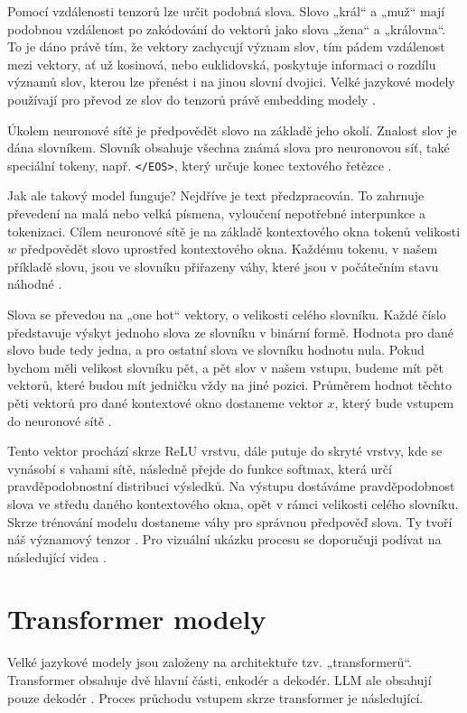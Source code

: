\documentclass[FM,DP]{tulthesis}
\begin{document}
		Pomocí vzdálenosti tenzorů lze určit podobná slova. Slovo „král“ a „muž“ mají podobnou vzdálenost po zakódování do vektorů jako slova „žena“ a „královna“. To je dáno právě tím, že vektory zachycují význam slov, tím pádem vzdálenost mezi vektory, ať už kosinová, nebo euklidovská, poskytuje informaci o rozdílu významů slov, kterou lze přenést i na jinou slovní dvojici. Velké jazykové modely používají pro převod ze slov do tenzorů právě embedding modely \cite{embeddings} \cite{embeddings2}.
		
		Úkolem neuronové sítě je předpovědět slovo na základě jeho okolí. Znalost slov je dána slovníkem. Slovník obsahuje všechna známá slova pro neuronovou síť, také speciální tokeny, např. \verb|</EOS>|, který určuje konec textového řetězce \cite{embeddings2}. 
		
		Jak ale takový model funguje? Nejdříve je text předzpracován. To zahrnuje převedení na malá nebo velká písmena, vyloučení nepotřebné interpunkce a tokenizaci. Cílem neuronové sítě je na základě kontextového okna tokenů velikosti $w$ předpovědět slovo uprostřed kontextového okna. Každému tokenu, v našem příkladě slovu, jsou ve slovníku přiřazeny váhy, které jsou v počátečním stavu náhodné \cite{ytb:word2vec}. 
		
		Slova se převedou na „one hot“ vektory, o velikosti celého slovníku. Každé číslo představuje výskyt jednoho slova ze slovníku v binární formě. Hodnota pro dané slovo bude tedy jedna, a pro ostatní slova ve slovníku hodnotu nula. Pokud bychom měli velikost slovníku pět, a pět slov v našem vstupu, budeme mít pět vektorů, které budou mít jedničku vždy na jiné pozici. Průměrem hodnot těchto pěti vektorů pro dané kontextové okno dostaneme vektor $x$, který bude vstupem do neuronové sítě \cite{ytb:word2vec}.
		
		Tento vektor prochází skrze ReLU vrstvu, dále putuje do skryté vrstvy, kde se vynásobí s vahami sítě, následně přejde do funkce softmax, která určí pravděpodobnostní distribuci výsledků. Na výstupu dostáváme pravděpodobnost slova ve středu daného kontextového okna, opět v rámci velikosti celého slovníku. Skrze trénování modelu dostaneme váhy pro správnou předpověď slova. Ty tvoří náš významový tenzor \cite{paper:word2vec} \cite{tokenization}. Pro vizuální ukázku procesu se doporučuji podívat na následující videa \cite{ytb:embeddings} \cite{ytb:word2vec}.
		
		\section{Transformer modely} \label{transformers}
		Velké jazykové modely jsou založeny na architektuře tzv. „transformerů“. Transformer obsahuje dvě hlavní části, enkodér a dekodér. LLM ale obsahují pouze dekodér \cite{rothman2021transformers}. Proces průchodu vstupem skrze transformer je následující.
		
\end{document}
